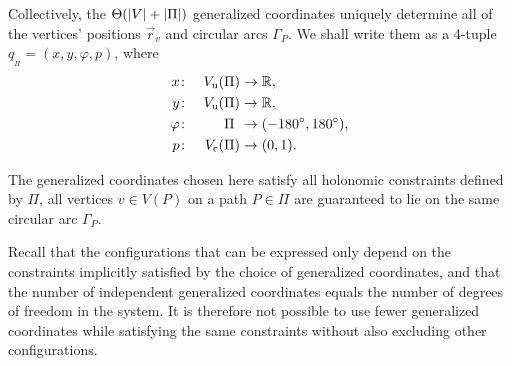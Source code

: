 \noindent
Collectively, the ${\Theta(\left\lvert V\right\rvert + \left\lvert\Pi\right\rvert)}$ generalized coordinates uniquely determine all of the vertices' positions ${\vec{r}_v}$ and circular arcs ${\Gamma_P}$. We shall write them as a 4-tuple ${q_{_\Pi} = (x, y, \varphi, p)}$, where
%
\begin{alignat*}{3}
  x & \colon & V_\text{u}(\Pi) &\to \mathbb{R},\\
  y & \colon & V_\text{u}(\Pi) &\to \mathbb{R},\\
  \varphi & \colon & \phantom{V_\text{u}(}\Pi\phantom{)} &\to (-180 \degrees, 180 \degrees),\\
  p & \colon & V_\text{c}(\Pi) &\to (0, 1).
\end{alignat*}

\noindent
The generalized coordinates chosen here satisfy all holonomic constraints defined by ${\Pi}$, \ie{} all vertices ${v \in V(P)}$ on a path ${P \in \Pi}$ are guaranteed to lie on the same circular arc $\Gamma_P$.

Recall that the configurations that can be expressed only depend on the constraints implicitly satisfied by the choice of generalized coordinates, and that the number of independent generalized coordinates equals the number of degrees of freedom in the system. It is therefore not possible to use fewer generalized coordinates while satisfying the same constraints without also excluding other configurations.
